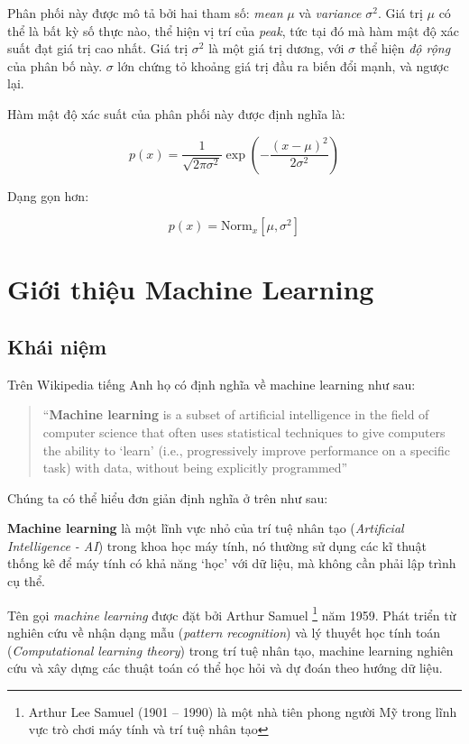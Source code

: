 \documentclass[../main-report.tex]{subfiles}
\begin{document}
Phân phối này được mô tả bởi hai tham số: \emph{mean} \(\mu\) và \emph{variance} \(\sigma^2\). Giá trị \(\mu\) có thể là bất kỳ số thực nào, thể hiện vị trí của \emph{peak}, tức tại đó mà hàm mật độ xác suất đạt giá trị cao nhất. Giá trị \(\sigma^2\) là một giá trị dương, với \(\sigma\) thể hiện \emph{độ rộng} của phân bố này. \(\sigma\) lớn chứng tỏ khoảng giá trị đầu ra biến đổi mạnh, và ngược lại.

Hàm mật độ xác suất của phân phối này được định nghĩa là:

\begin{equation}
  p(x) = \frac{1}{\sqrt{2\pi \sigma^2}}\exp \left( -\frac{(x - \mu)^2}{2\sigma^2}\right)
\end{equation}

Dạng gọn hơn:

\begin{equation}
p(x) = \text{Norm}_x [\mu, \sigma^2]
\end{equation}

\section{Giới thiệu Machine Learning}
\subsection{Khái niệm}
Trên Wikipedia tiếng Anh họ có định nghĩa về machine learning như sau:

\begin{quote}
``\textbf{Machine learning} is a subset of artificial intelligence in the field of computer science that often uses statistical techniques to give computers the ability to `learn' (i.e., progressively improve performance on a specific task) with data, without being explicitly programmed'' \citep{wiki:machine_learning}
\end{quote}

Chúng ta có thể hiểu đơn giản định nghĩa ở trên như sau: 

\textbf{Machine learning} là một lĩnh vực nhỏ của trí tuệ nhân tạo (\textit{Artificial Intelligence - AI}) trong khoa học máy tính, nó thường sử dụng các kĩ thuật thống kê để máy tính có khả năng `học' với dữ liệu, mà không cần phải lập trình cụ thể.

Tên gọi \emph{machine learning} được đặt bởi Arthur Samuel \footnote{Arthur Lee Samuel (1901 – 1990) là một nhà tiên phong người Mỹ trong lĩnh vực trò chơi máy tính và trí tuệ nhân tạo} năm 1959. Phát triển từ nghiên cứu về nhận dạng mẫu (\emph{pattern recognition}) và lý thuyết học tính toán (\emph{Computational learning theory}) trong trí tuệ nhân tạo, machine learning nghiên cứu và xây dựng các thuật toán có thể học hỏi và dự đoán theo hướng dữ liệu.
\end{document}
